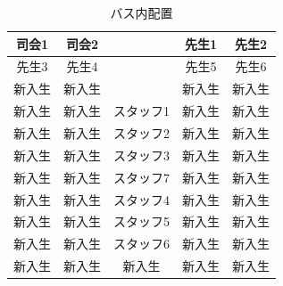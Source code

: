 

\begin{table}[htb]
  \begin{center}
  \begin{tabular}{|c|c||c||c|c|} \hline
  司会1  & 司会2  &           & 先生1  & 先生2  \\ \hline
  先生3  & 先生4  &           & 先生5  & 先生6  \\ \hline
  新入生 & 新入生 &           & 新入生 & 新入生 \\ \hline
  新入生 & 新入生 & スタッフ1 & 新入生 & 新入生 \\ \hline
  新入生 & 新入生 & スタッフ2 & 新入生 & 新入生 \\ \hline
  新入生 & 新入生 & スタッフ3 & 新入生 & 新入生 \\ \hline
  新入生 & 新入生 & スタッフ7 & 新入生 & 新入生 \\ \hline
  新入生 & 新入生 & スタッフ4 & 新入生 & 新入生 \\ \hline
  新入生 & 新入生 & スタッフ5 & 新入生 & 新入生 \\ \hline
  新入生 & 新入生 & スタッフ6 & 新入生 & 新入生 \\ \hline
  新入生 & 新入生 &  新入生   & 新入生 & 新入生 \\ \hline

  \end{tabular}
\caption{バス内配置}
  \end{center}
\end{table}

\vspace{10mm}

